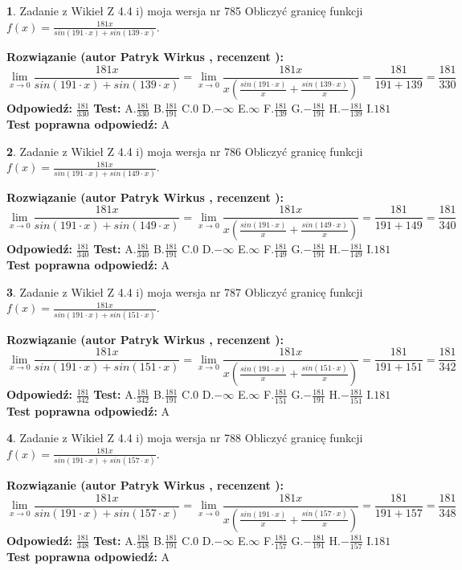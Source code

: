 \documentclass[12pt, a4paper]{article}
\theoremstyle{definition} %
\newtheorem{zad}{}
\newcommand{\zadStart}[1]{\begin{zad}#1\newline}
\newcommand{\zadStop}{\end{zad}}
\newcommand{\rozwStart}[2]{\noindent \textbf{Rozwiązanie (autor #1 , recenzent #2): }\newline}
\newcommand{\rozwStop}{\newline}
\newcommand{\odpStart}{\noindent \textbf{Odpowiedź:}\newline}
\newcommand{\odpStop}{\newline}
\newcommand{\testStart}{\noindent \textbf{Test:}\newline}
\newcommand{\testStop}{\newline}
\newcommand{\kluczStart}{\noindent \textbf{Test poprawna odpowiedź:}\newline}
\newcommand{\kluczStop}{\newline}
\begin{document}
\zadStart{Zadanie z Wikieł Z 4.4 i) moja wersja nr 785}
Obliczyć granicę funkcji $f(x)=\frac{181x}{sin(191\cdot x) +sin(139\cdot x)}$.
\zadStop
\rozwStart{Patryk Wirkus}{}
$$\lim\limits_{x\to 0}\frac{181x}{sin(191\cdot x) +sin(139\cdot x)}=\lim\limits_{x\to 0}\frac{181x}{x(\frac{sin(191\cdot x)}{x}+\frac{sin(139\cdot x)}{x})}=\frac{181}{191+139} = \frac{181}{330}$$
\rozwStop
\odpStart
$\frac{181}{330}$
\odpStop
\testStart
A.$\frac{181}{330}$
B.$\frac{181}{191}$
C.$0$
D.$-\infty$
E.$\infty$
F.$\frac{181}{139}$
G.$-\frac{181}{191}$
H.$-\frac{181}{139}$
I.$181$
\testStop
\kluczStart
A
\kluczStop



\zadStart{Zadanie z Wikieł Z 4.4 i) moja wersja nr 786}
Obliczyć granicę funkcji $f(x)=\frac{181x}{sin(191\cdot x) +sin(149\cdot x)}$.
\zadStop
\rozwStart{Patryk Wirkus}{}
$$\lim\limits_{x\to 0}\frac{181x}{sin(191\cdot x) +sin(149\cdot x)}=\lim\limits_{x\to 0}\frac{181x}{x(\frac{sin(191\cdot x)}{x}+\frac{sin(149\cdot x)}{x})}=\frac{181}{191+149} = \frac{181}{340}$$
\rozwStop
\odpStart
$\frac{181}{340}$
\odpStop
\testStart
A.$\frac{181}{340}$
B.$\frac{181}{191}$
C.$0$
D.$-\infty$
E.$\infty$
F.$\frac{181}{149}$
G.$-\frac{181}{191}$
H.$-\frac{181}{149}$
I.$181$
\testStop
\kluczStart
A
\kluczStop



\zadStart{Zadanie z Wikieł Z 4.4 i) moja wersja nr 787}
Obliczyć granicę funkcji $f(x)=\frac{181x}{sin(191\cdot x) +sin(151\cdot x)}$.
\zadStop
\rozwStart{Patryk Wirkus}{}
$$\lim\limits_{x\to 0}\frac{181x}{sin(191\cdot x) +sin(151\cdot x)}=\lim\limits_{x\to 0}\frac{181x}{x(\frac{sin(191\cdot x)}{x}+\frac{sin(151\cdot x)}{x})}=\frac{181}{191+151} = \frac{181}{342}$$
\rozwStop
\odpStart
$\frac{181}{342}$
\odpStop
\testStart
A.$\frac{181}{342}$
B.$\frac{181}{191}$
C.$0$
D.$-\infty$
E.$\infty$
F.$\frac{181}{151}$
G.$-\frac{181}{191}$
H.$-\frac{181}{151}$
I.$181$
\testStop
\kluczStart
A
\kluczStop



\zadStart{Zadanie z Wikieł Z 4.4 i) moja wersja nr 788}
Obliczyć granicę funkcji $f(x)=\frac{181x}{sin(191\cdot x) +sin(157\cdot x)}$.
\zadStop
\rozwStart{Patryk Wirkus}{}
$$\lim\limits_{x\to 0}\frac{181x}{sin(191\cdot x) +sin(157\cdot x)}=\lim\limits_{x\to 0}\frac{181x}{x(\frac{sin(191\cdot x)}{x}+\frac{sin(157\cdot x)}{x})}=\frac{181}{191+157} = \frac{181}{348}$$
\rozwStop
\odpStart
$\frac{181}{348}$
\odpStop
\testStart
A.$\frac{181}{348}$
B.$\frac{181}{191}$
C.$0$
D.$-\infty$
E.$\infty$
F.$\frac{181}{157}$
G.$-\frac{181}{191}$
H.$-\frac{181}{157}$
I.$181$
\testStop
\kluczStart
A
\kluczStop
\end{document}
